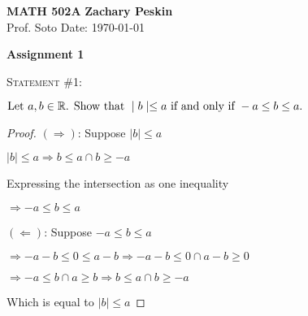 \documentclass[12pt]{article}
\newenvironment{statement}[1]
{\begin{mdframed}[linewidth=0.6pt]
        \textsc{Statement #1:}

}
    {\end{mdframed}}
\begin{document}
\noindent
\textbf{MATH 502A} \hfill \textbf{Zachary Peskin} \\
\normalsize Prof. Soto \hfill Date: \today \\

\begin{center}
\textbf{Assignment 1}
\end{center}

\begin{statement}{\#1}
\begin{math}
\textrm{Let }a,b\in\mathbb{R}\textrm{. Show that }\mid b\mid\leq a\textrm{ if and only if }-a\leq b\leq a\textrm .
\end{math}
\end{statement}

\begin{proof}
$\left(\Rightarrow\right)$: Suppose $\mid b\mid\leq a$



\begin{center}
\begin{math}
\mid b\mid\leq a \Rightarrow b\leq a\cap b\geq-a
\end{math}
\end{center}



Expressing the intersection as one inequality
\begin{center}
\begin{math}
\Rightarrow-a\leq b\leq a
\end{math}
\end{center}







\bigskip\bigskip
$\left(\Leftarrow\right)$: Suppose $-a\leq b\leq a$



\begin{center}
\begin{math}
\Rightarrow -a-b\leq0\leq a-b\Rightarrow-a-b\leq0\cap a-b\geq0
\end{math}
\end{center}





\begin{center}
\begin{math}
\Rightarrow -a\leq b\cap a\geq b\Rightarrow b\leq a\cap b\geq-a
\end{math}
\end{center}


Which is equal to $\mid b \mid\leq a$

\end{proof}
\end{document}
